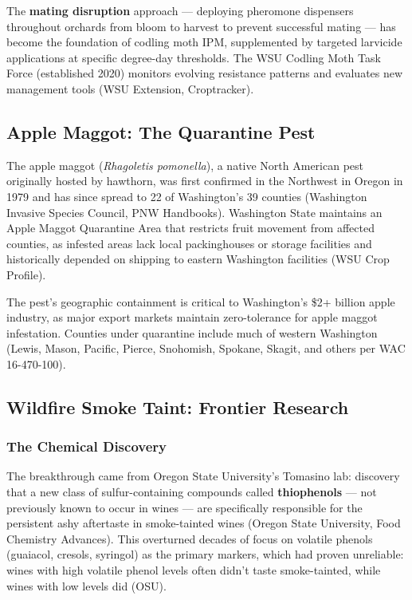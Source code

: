 \documentclass[11pt,letterpaper]{article}
\begin{document}
The \textbf{mating disruption} approach --- deploying pheromone dispensers throughout orchards from bloom to harvest to prevent successful mating --- has become the foundation of codling moth IPM, supplemented by targeted larvicide applications at specific degree-day thresholds. The WSU Codling Moth Task Force (established 2020) monitors evolving resistance patterns and evaluates new management tools (WSU Extension, Croptracker).

\subsection{Apple Maggot: The Quarantine Pest}

The apple maggot (\textit{Rhagoletis pomonella}), a native North American pest originally hosted by hawthorn, was first confirmed in the Northwest in Oregon in 1979 and has since spread to 22 of Washington's 39 counties (Washington Invasive Species Council, PNW Handbooks). Washington State maintains an Apple Maggot Quarantine Area that restricts fruit movement from affected counties, as infested areas lack local packinghouses or storage facilities and historically depended on shipping to eastern Washington facilities (WSU Crop Profile).

The pest's geographic containment is critical to Washington's \$2+ billion apple industry, as major export markets maintain zero-tolerance for apple maggot infestation. Counties under quarantine include much of western Washington (Lewis, Mason, Pacific, Pierce, Snohomish, Spokane, Skagit, and others per WAC 16-470-100).

\subsection{Wildfire Smoke Taint: Frontier Research}

\subsubsection{The Chemical Discovery}

The breakthrough came from Oregon State University's Tomasino lab: discovery that a new class of sulfur-containing compounds called \textbf{thiophenols} --- not previously known to occur in wines --- are specifically responsible for the persistent ashy aftertaste in smoke-tainted wines (Oregon State University, Food Chemistry Advances). This overturned decades of focus on volatile phenols (guaiacol, cresols, syringol) as the primary markers, which had proven unreliable: wines with high volatile phenol levels often didn't taste smoke-tainted, while wines with low levels did (OSU).
\end{document}
